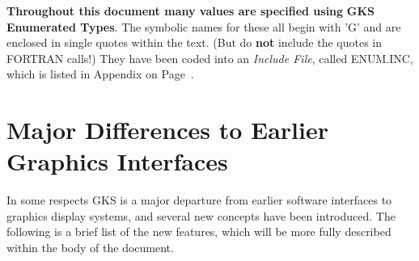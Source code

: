 \begin{note}
 
{\bf Throughout this document many values are specified using}
{\bf GKS Enumerated Types}. The symbolic names for these all
begin with 'G' and are enclosed in single quotes within the text.
(But do {\bf not} include the quotes in FORTRAN calls!)
They have been coded into an {\it Include File},
called ENUM.INC, which is listed in Appendix on Page~\pageref{sec:hdenum}.
\end{note}
\section{Major Differences to Earlier Graphics Interfaces}
 
In some respects GKS is a major departure from earlier software
interfaces to graphics display systems, and several new concepts have
been introduced. The following is a brief list of the new features,
which will be more fully described within the body of the document.
